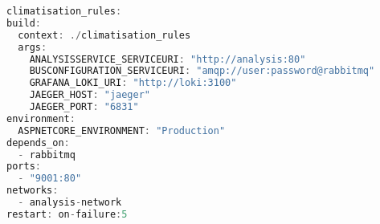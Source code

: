 \begin{lstlisting}[language={C++},caption={Ejemplo de declaración de despliegue de un servicio en Docker Compose},captionpos=b, label=ls:docker-compose-example]
climatisation_rules:
build:
  context: ./climatisation_rules
  args:
    ANALYSISSERVICE_SERVICEURI: "http://analysis:80"
    BUSCONFIGURATION_SERVICEURI: "amqp://user:password@rabbitmq"
    GRAFANA_LOKI_URI: "http://loki:3100"
    JAEGER_HOST: "jaeger"
    JAEGER_PORT: "6831"
environment:
  ASPNETCORE_ENVIRONMENT: "Production"
depends_on:
  - rabbitmq
ports:
  - "9001:80"
networks:
  - analysis-network
restart: on-failure:5
  \end{lstlisting}
